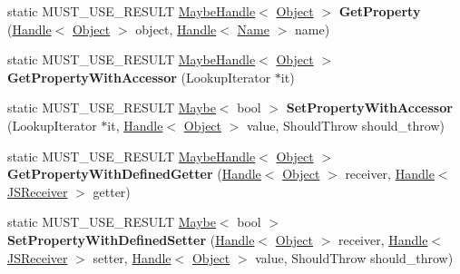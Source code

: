 \begin{DoxyCompactItemize}
\item 
static M\+U\+S\+T\+\_\+\+U\+S\+E\+\_\+\+R\+E\+S\+U\+LT \hyperlink{classv8_1_1internal_1_1_maybe_handle}{Maybe\+Handle}$<$ \hyperlink{classv8_1_1internal_1_1_object}{Object} $>$ {\bfseries Get\+Property} (\hyperlink{classv8_1_1internal_1_1_handle}{Handle}$<$ \hyperlink{classv8_1_1internal_1_1_object}{Object} $>$ object, \hyperlink{classv8_1_1internal_1_1_handle}{Handle}$<$ \hyperlink{classv8_1_1internal_1_1_name}{Name} $>$ name)\hypertarget{classv8_1_1internal_1_1_object_afb6640bcc761cc603969addb4b208cf4}{}\label{classv8_1_1internal_1_1_object_afb6640bcc761cc603969addb4b208cf4}

\item 
static M\+U\+S\+T\+\_\+\+U\+S\+E\+\_\+\+R\+E\+S\+U\+LT \hyperlink{classv8_1_1internal_1_1_maybe_handle}{Maybe\+Handle}$<$ \hyperlink{classv8_1_1internal_1_1_object}{Object} $>$ {\bfseries Get\+Property\+With\+Accessor} (Lookup\+Iterator $\ast$it)\hypertarget{classv8_1_1internal_1_1_object_a110ef101c1f7db3f660758448a83681b}{}\label{classv8_1_1internal_1_1_object_a110ef101c1f7db3f660758448a83681b}

\item 
static M\+U\+S\+T\+\_\+\+U\+S\+E\+\_\+\+R\+E\+S\+U\+LT \hyperlink{classv8_1_1_maybe}{Maybe}$<$ bool $>$ {\bfseries Set\+Property\+With\+Accessor} (Lookup\+Iterator $\ast$it, \hyperlink{classv8_1_1internal_1_1_handle}{Handle}$<$ \hyperlink{classv8_1_1internal_1_1_object}{Object} $>$ value, Should\+Throw should\+\_\+throw)\hypertarget{classv8_1_1internal_1_1_object_af4e940f445605f04cbb99761daa02e22}{}\label{classv8_1_1internal_1_1_object_af4e940f445605f04cbb99761daa02e22}

\item 
static M\+U\+S\+T\+\_\+\+U\+S\+E\+\_\+\+R\+E\+S\+U\+LT \hyperlink{classv8_1_1internal_1_1_maybe_handle}{Maybe\+Handle}$<$ \hyperlink{classv8_1_1internal_1_1_object}{Object} $>$ {\bfseries Get\+Property\+With\+Defined\+Getter} (\hyperlink{classv8_1_1internal_1_1_handle}{Handle}$<$ \hyperlink{classv8_1_1internal_1_1_object}{Object} $>$ receiver, \hyperlink{classv8_1_1internal_1_1_handle}{Handle}$<$ \hyperlink{classv8_1_1internal_1_1_j_s_receiver}{J\+S\+Receiver} $>$ getter)\hypertarget{classv8_1_1internal_1_1_object_a60e3ff2136485ae51459dee807c848ff}{}\label{classv8_1_1internal_1_1_object_a60e3ff2136485ae51459dee807c848ff}

\item 
static M\+U\+S\+T\+\_\+\+U\+S\+E\+\_\+\+R\+E\+S\+U\+LT \hyperlink{classv8_1_1_maybe}{Maybe}$<$ bool $>$ {\bfseries Set\+Property\+With\+Defined\+Setter} (\hyperlink{classv8_1_1internal_1_1_handle}{Handle}$<$ \hyperlink{classv8_1_1internal_1_1_object}{Object} $>$ receiver, \hyperlink{classv8_1_1internal_1_1_handle}{Handle}$<$ \hyperlink{classv8_1_1internal_1_1_j_s_receiver}{J\+S\+Receiver} $>$ setter, \hyperlink{classv8_1_1internal_1_1_handle}{Handle}$<$ \hyperlink{classv8_1_1internal_1_1_object}{Object} $>$ value, Should\+Throw should\+\_\+throw)\hypertarget{classv8_1_1internal_1_1_object_a22a70157b9eac8378561666c1ecbb04e}{}\label{classv8_1_1internal_1_1_object_a22a70157b9eac8378561666c1ecbb04e}


\end{DoxyCompactItemize}
